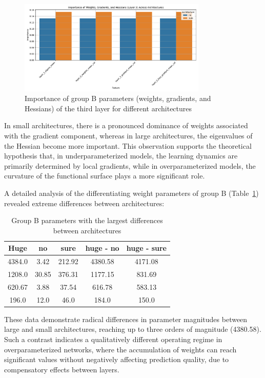 \documentclass[a4paper,12pt]{article}
\begin{document}
\begin{figure}[ht]
  \centering
  \includegraphics[width=0.8\textwidth]{resources_en/feature_importance_layer3.pdf}
  \caption{Importance of group B parameters (weights, gradients, and Hessians) of the third layer for
  different architectures}
  \label{fig:feature_importance}
\end{figure}

In small architectures, there is a pronounced dominance of weights associated with the gradient component,
whereas in large architectures, the eigenvalues of the Hessian become more important. This observation
supports the theoretical hypothesis that, in underparameterized models, the learning dynamics are primarily
determined by local gradients, while in overparameterized models, the curvature of the functional surface
plays a more significant role.

A detailed analysis of the differentiating weight parameters of group B (Table~\ref{tab:weight_diff})
revealed extreme differences between architectures:

\begin{table}[ht]
  \centering
  \begin{tabular}{|c|c|c|c|c|}
    \hline
    \textbf{Huge} & \textbf{no} & \textbf{sure} & \textbf{huge - no} & \textbf{huge - sure} \\
    \hline
    4384.0 & 3.42 & 212.92 & 4380.58 & 4171.08 \\
    1208.0 & 30.85 & 376.31 & 1177.15 & 831.69 \\
    620.67 & 3.88 & 37.54 & 616.78 & 583.13 \\
    196.0 & 12.0 & 46.0 & 184.0 & 150.0 \\
    \hline
  \end{tabular}
  \caption{Group B parameters with the largest differences between architectures}
  \label{tab:weight_diff}
\end{table}

These data demonstrate radical differences in parameter magnitudes between large and small architectures,
reaching up to three orders of magnitude (4380.58). Such a contrast indicates a qualitatively different
operating regime in overparameterized networks, where the accumulation of weights can reach significant
values without negatively affecting prediction quality, due to compensatory effects between layers.
\end{document}
